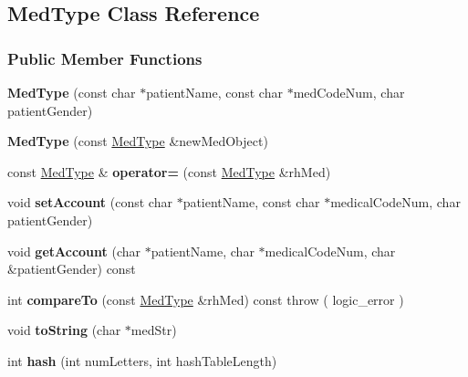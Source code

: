 \hypertarget{class_med_type}{}\subsection{Med\+Type Class Reference}
\label{class_med_type}
\subsubsection*{Public Member Functions}
\begin{DoxyCompactItemize}
\item 
\hypertarget{class_med_type_aa09b20f696d4f8912fa4403fafb02e7f}{}{\bfseries Med\+Type} (const char $\ast$patient\+Name, const char $\ast$med\+Code\+Num, char patient\+Gender)\label{class_med_type_aa09b20f696d4f8912fa4403fafb02e7f}

\item 
\hypertarget{class_med_type_a8b9b2a972d3c8e3fadcd54bfd180816e}{}{\bfseries Med\+Type} (const \hyperlink{class_med_type}{Med\+Type} \&new\+Med\+Object)\label{class_med_type_a8b9b2a972d3c8e3fadcd54bfd180816e}

\item 
\hypertarget{class_med_type_a37cf29e0d94358075d10f87fbb721194}{}const \hyperlink{class_med_type}{Med\+Type} \& {\bfseries operator=} (const \hyperlink{class_med_type}{Med\+Type} \&rh\+Med)\label{class_med_type_a37cf29e0d94358075d10f87fbb721194}

\item 
\hypertarget{class_med_type_a64043272ca4a049433767c9adb0c9e7b}{}void {\bfseries set\+Account} (const char $\ast$patient\+Name, const char $\ast$medical\+Code\+Num, char patient\+Gender)\label{class_med_type_a64043272ca4a049433767c9adb0c9e7b}

\item 
\hypertarget{class_med_type_a96e08229a13c1edd4e771fc003431161}{}void {\bfseries get\+Account} (char $\ast$patient\+Name, char $\ast$medical\+Code\+Num, char \&patient\+Gender) const \label{class_med_type_a96e08229a13c1edd4e771fc003431161}

\item 
\hypertarget{class_med_type_a79b2b6ccbd2082e8cb5f4b01cda903dd}{}int {\bfseries compare\+To} (const \hyperlink{class_med_type}{Med\+Type} \&rh\+Med) const   throw ( logic\+\_\+error )\label{class_med_type_a79b2b6ccbd2082e8cb5f4b01cda903dd}

\item 
\hypertarget{class_med_type_aeba9f29632e1eaa4e1f180a1692aba48}{}void {\bfseries to\+String} (char $\ast$med\+Str)\label{class_med_type_aeba9f29632e1eaa4e1f180a1692aba48}

\item 
\hypertarget{class_med_type_a3be2fce3736186bb16ce93fb36f24f3c}{}int {\bfseries hash} (int num\+Letters, int hash\+Table\+Length)\label{class_med_type_a3be2fce3736186bb16ce93fb36f24f3c}

\end{DoxyCompactItemize}
